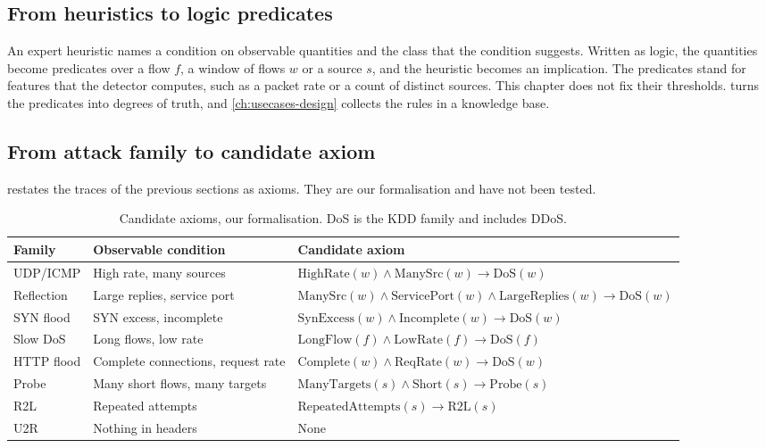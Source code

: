 \subsection{From heuristics to logic predicates}
\label{sec:heuristics-to-predicates}

An expert heuristic names a condition on observable quantities and the class
that the condition suggests. Written as logic, the quantities become
predicates over a flow $f$, a window of flows $w$ or a source $s$, and the
heuristic becomes an implication. The predicates stand for features that the
detector computes, such as a packet rate or a count of distinct sources. This
chapter does not fix their thresholds.  turns the predicates into
degrees of truth, and \cref{ch:usecases-design} collects the rules in a knowledge base.

\subsection{From attack family to candidate axiom}
\label{sec:family-condition-axiom}

 restates the traces of the previous sections as
axioms. They are our formalisation and have not been tested.

\begin{table}[htbp]
\centering
\footnotesize
\setlength{\tabcolsep}{3pt}
\caption{Candidate axioms, our formalisation. DoS is the KDD family and
includes DDoS.}
\label{tab:candidate-axioms}
\begin{tabular}{@{}p{1.9cm}p{3.9cm}p{6.5cm}@{}}
\toprule
Family & Observable condition & Candidate axiom \\
\midrule
UDP/ICMP & High rate, many sources
  & $\mathrm{HighRate}(w)\wedge\mathrm{ManySrc}(w)\rightarrow\mathrm{DoS}(w)$ \\
Reflection & Large replies, service port
  & $\mathrm{ManySrc}(w)\wedge\mathrm{ServicePort}(w)\wedge\mathrm{LargeReplies}(w)\rightarrow\mathrm{DoS}(w)$ \\
SYN flood & SYN excess, incomplete
  & $\mathrm{SynExcess}(w)\wedge\mathrm{Incomplete}(w)\rightarrow\mathrm{DoS}(w)$ \\
Slow DoS & Long flows, low rate
  & $\mathrm{LongFlow}(f)\wedge\mathrm{LowRate}(f)\rightarrow\mathrm{DoS}(f)$ \\
HTTP flood & Complete connections, request rate
  & $\mathrm{Complete}(w)\wedge\mathrm{ReqRate}(w)\rightarrow\mathrm{DoS}(w)$ \\
Probe & Many short flows, many targets
  & $\mathrm{ManyTargets}(s)\wedge\mathrm{Short}(s)\rightarrow\mathrm{Probe}(s)$ \\
R2L & Repeated attempts
  & $\mathrm{RepeatedAttempts}(s)\rightarrow\mathrm{R2L}(s)$ \\
U2R & Nothing in headers & None \\
\bottomrule
\end{tabular}
\end{table}

